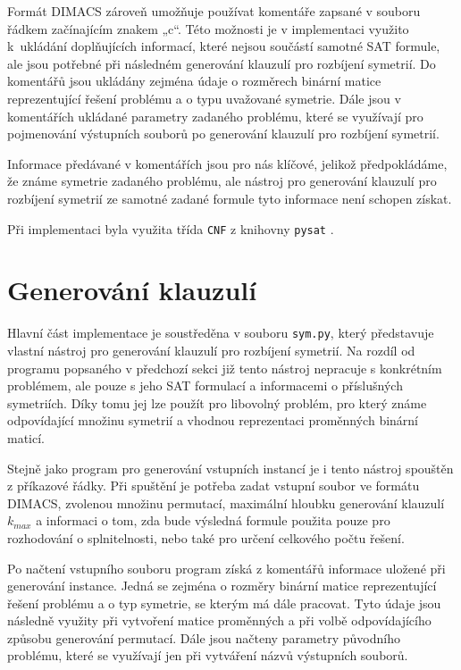 Formát DIMACS zároveň umožňuje používat komentáře zapsané v souboru řádkem začínajícím znakem „c“. Této možnosti je v implementaci využito k ukládání doplňujících informací, které nejsou součástí samotné SAT formule, ale jsou potřebné při následném generování klauzulí pro rozbíjení symetrií. Do komentářů jsou ukládány zejména údaje o rozměrech binární matice reprezentující řešení problému a o typu uvažované symetrie. Dále jsou v komentářích ukládané parametry zadaného problému, které se využívají pro pojmenování výstupních souborů po generování klauzulí pro rozbíjení symetrií.

Informace předávané v komentářích jsou pro nás klíčové, jelikož předpokládáme, že známe symetrie zadaného problému, ale nástroj pro generování klauzulí pro rozbíjení symetrií ze samotné zadané formule tyto informace není schopen získat.

Při implementaci byla využita třída \texttt{CNF} z knihovny \texttt{pysat} \cite{imms-sat18}.

\section{Generování klauzulí}

Hlavní část implementace je soustředěna v souboru \texttt{sym.py}, který představuje vlastní nástroj pro generování klauzulí pro rozbíjení symetrií. Na rozdíl od programu popsaného v předchozí sekci již tento nástroj nepracuje s konkrétním problémem, ale pouze s jeho SAT formulací a informacemi o příslušných symetriích. Díky tomu jej lze použít pro libovolný problém, pro který známe odpovídající množinu symetrií a vhodnou reprezentaci proměnných binární maticí.

Stejně jako program pro generování vstupních instancí je i tento nástroj spouštěn z příkazové řádky. Při spuštění je potřeba zadat vstupní soubor ve formátu DIMACS, zvolenou množinu permutací, maximální hloubku generování klauzulí $k_{max}$ a informaci o tom, zda bude výsledná formule použita pouze pro rozhodování o splnitelnosti, nebo také pro určení celkového počtu řešení.

Po načtení vstupního souboru program získá z komentářů informace uložené při generování instance. Jedná se zejména o rozměry binární matice reprezentující řešení problému a o typ symetrie, se kterým má dále pracovat. Tyto údaje jsou následně využity při vytvoření matice proměnných a při volbě odpovídajícího způsobu generování permutací. Dále jsou načteny parametry původního problému, které se využívají jen při vytváření názvů výstupních souborů.

